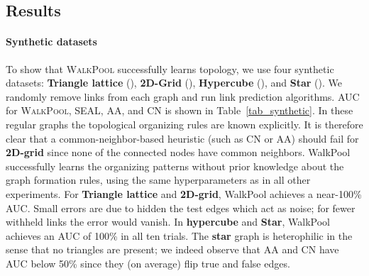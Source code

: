 \documentclass[11pt]{article}
\newcommand{\walkpool}{\textsc{WalkPool}\xspace}
\newcommand{\UPDATE}[1]{\textcolor{WowColor}{{#1}}}
\renewcommand{\UPDATE}[1]{#1}
\begin{document}
\subsection{Results}
\vspace{-1mm}
\UPDATE{\paragraph{Synthetic datasets} To show that \walkpool successfully learns topology, we use four synthetic datasets: \textbf{Triangle lattice} (), \textbf{2D-Grid} (), \textbf{Hypercube} (), and \textbf{Star} (). We randomly remove  links from each graph and run link prediction algorithms. AUC for \walkpool, SEAL, AA, and CN is shown in Table~\ref{tab_synthetic}. In these regular graphs the topological organizing rules are known explicitly. It is therefore clear that a common-neighbor-based heuristic (such as CN or AA) should fail for \textbf{2D-grid} since none of the connected nodes have common neighbors. WalkPool successfully learns the organizing patterns without  prior knowledge about the graph formation rules, using the same hyperparameters as in all other experiments. For \textbf{Triangle lattice} and \textbf{2D-grid}, WalkPool achieves a near-100\% AUC. Small errors are due to hidden the test edges which act as noise; for fewer withheld links the error would vanish. In \textbf{hypercube} and \textbf{Star}, WalkPool achieves an AUC of 100\% in all ten trials. The \textbf{star} graph is heterophilic in the sense that no triangles are present; we indeed observe that AA and CN have AUC below 50\% since they (on average) flip true and false edges.} 
\begin{table}[!]
\centering
{}
    \caption{AUC for synthetic graphs over 10 independent trials.}
\label{tab_synthetic}
\vspace{-3mm}
\end{table}
\vspace{-4mm}
\end{document}
